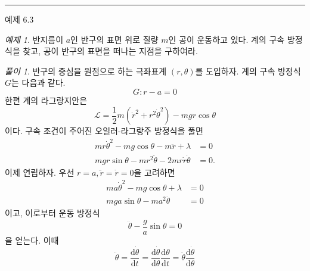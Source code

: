 \documentclass[chapter, oneside, b5paper]{oblivoir}
\theoremstyle{plain}
\theoremstyle{definition}
\theoremstyle{remark}
\newtheorem{example}{예제}[chapter]    %
\newtheorem*{solution}{풀이}
\begin{document}
\noindent\rule{\textwidth}{0.8pt} %
\vspace{1em} %

\begin{examplebox}{예제 6.3}
\begin{example}
반지름이 $a$인 반구의 표면 위로 질량 $m$인 공이 운동하고 있다. 계의 구속 방정식을 찾고, 공이 반구의 표면을 떠나는 지점을 구하여라.
\end{example}
\end{examplebox}

\begin{solution}
    반구의 중심을 원점으로 하는 극좌표계 $(r, \theta)$를 도입하자. 계의 구속 방정식 $G$는 다음과 같다.
    \begin{equation}
        G : r - a = 0
    \end{equation}
    한편 계의 라그랑지안은
    \begin{equation}
        \mathcal{L} = \frac{1}{2}m(\dot{r}^2 + r^2\dot{\theta}^2) - mgr\cos{\theta}
    \end{equation}
    이다. 구속 조건이 주어진 오일러-라그랑주 방정식을 풀면
    \begin{equation}
        \begin{aligned}
            mr\dot{\theta}^2 - mg\cos{\theta} - m\ddot{r} + \lambda &= 0 \\
            mgr\sin{\theta} - mr^2\ddot{\theta} - 2mr\dot{r}\dot{\theta} &= 0.
        \end{aligned}
    \end{equation}
    이제 연립하자. 우선 $r=a, \ddot{r} = \dot{r} =0$을 고려하면
    \begin{equation}
        \begin{aligned}
            ma\dot{\theta}^2 - mg\cos{\theta} + \lambda &= 0 \\
            mga\sin{\theta} - ma^2\ddot{\theta} &= 0
        \end{aligned}
    \end{equation}
    이고, 이로부터 운동 방정식
    \begin{equation}
        \ddot{\theta} - \frac{g}{a}\sin{\theta} = 0
    \end{equation}
    을 얻는다. 이때
    \begin{equation}
        \ddot{\theta} = \frac{\mathrm{d}\dot{\theta}}{\mathrm{d}t} = \frac{\mathrm{d}\dot{\theta}}{\mathrm{d}\theta}\frac{\mathrm{d}\theta}{\mathrm{d}t} = \dot{\theta}\frac{\mathrm{d}\dot{\theta}}{\mathrm{d}\theta}

\end{equation}
\end{solution}
\end{document}
